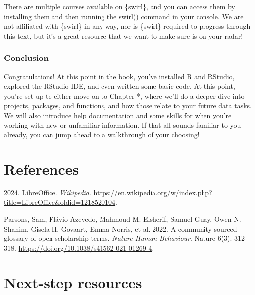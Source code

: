 \documentclass[
  letterpaper,
  DIV=11,
  numbers=noendperiod]{scrreprt}
\newlength{\cslhangindent}
\newenvironment{CSLReferences}[2] %
 {\begin{list}{}{%
  \setlength{\itemindent}{0pt}
  \setlength{\leftmargin}{0pt}
  \setlength{\parsep}{0pt}
  \ifodd #1
   \setlength{\leftmargin}{\cslhangindent}
   \setlength{\itemindent}{-1\cslhangindent}
  \fi
  \setlength{\itemsep}{#2\baselineskip}}}
 {\end{list}}
\begin{document}
There are multiple courses available on \{swirl\}, and you can access
them by installing them and then running the swirl() command in your
console. We are not affiliated with \{swirl\} in any way, nor is
\{swirl\} required to progress through this text, but it's a great
resource that we want to make sure is on your radar!

\subsection{Conclusion}\label{conclusion}

Congratulations! At this point in the book, you've installed R and
RStudio, explored the RStudio IDE, and even written some basic code. At
this point, you're set up to either move on to Chapter *, where we'll do
a deeper dive into projects, packages, and functions, and how those
relate to your future data tasks. We will also introduce help
documentation and some skills for when you're working with new or
unfamiliar information. If that all sounds familiar to you already, you
can jump ahead to a walkthrough of your choosing!


\chapter*{References}\label{references}


\label{refs}
\begin{CSLReferences}{1}{0}
2024. LibreOffice. \emph{Wikipedia}.
\url{https://en.wikipedia.org/w/index.php?title=LibreOffice&oldid=1218520104}.

Parsons, Sam, Flávio Azevedo, Mahmoud M. Elsherif, Samuel Guay, Owen N.
Shahim, Gisela H. Govaart, Emma Norris, et al. 2022. A community-sourced
glossary of open scholarship terms. \emph{Nature Human Behaviour}.
Nature 6(3). 312--318. \url{https://doi.org/10.1038/s41562-021-01269-4}.

\end{CSLReferences}

\cleardoublepage
{}
{}
\appendix

\chapter{Next-step resources}\label{next-step-resources}
\end{document}
